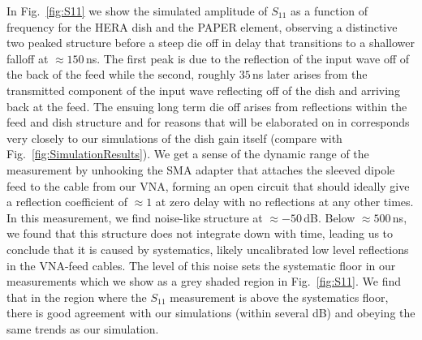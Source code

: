 \documentclass[twocolumn]{emulateapj}
\begin{document}
In Fig.~\ref{fig:S11} we show the simulated amplitude of $S_{11}$ as a function of frequency for the HERA dish and the PAPER element, observing a distinctive two peaked structure before a steep die off in delay that transitions to a shallower falloff at $\approx 150$\,ns. The first peak is due to the reflection of the input wave off of the back of the feed while the second, roughly $35$\,ns later arises from the transmitted component of the input wave reflecting off of the dish and arriving back at the feed. The ensuing long term die off arises from reflections within the feed and dish structure and for reasons that will be elaborated on in \citet{Patra:2016} corresponds very closely to our simulations of the dish gain itself (compare with Fig.~\ref{fig:SimulationResults}).  We get a sense of the dynamic range of the measurement by unhooking the SMA adapter that attaches the sleeved dipole feed to the cable from our VNA, forming an open circuit that should ideally give a reflection coefficient of $\approx 1$ at zero delay with no reflections at any other times. In this measurement, we find noise-like structure at $\approx -50$\,dB. Below $\approx 500$\,ns, we found that this structure does not integrate down with time, leading us to conclude that it is caused by systematics, likely uncalibrated low level reflections in the VNA-feed cables. The level of this noise sets the systematic floor in our measurements which we show as a grey shaded region in Fig.~\ref{fig:S11}. We find that in the region where the $S_{11}$ measurement is above the systematics floor, there is good agreement with our simulations (within several dB) and obeying the same trends as our simulation.
\end{document}
